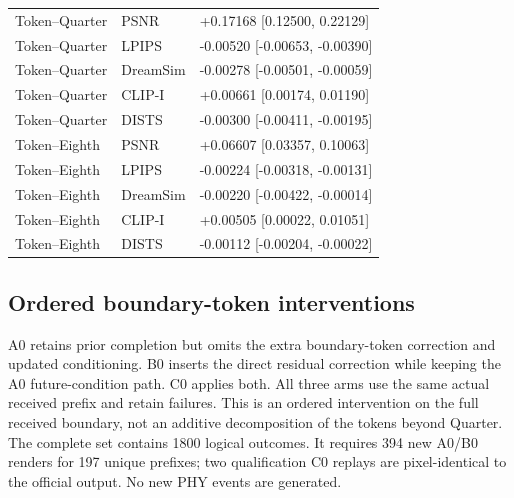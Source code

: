 \documentclass[10pt,letterpaper]{article}
\begin{document}
\begin{longtable}{@{}lll@{}}
Token--Quarter & PSNR & +0.17168 [0.12500, 0.22129]\\
Token--Quarter & LPIPS & -0.00520 [-0.00653, -0.00390]\\
Token--Quarter & DreamSim & -0.00278 [-0.00501, -0.00059]\\
Token--Quarter & CLIP-I & +0.00661 [0.00174, 0.01190]\\
Token--Quarter & DISTS & -0.00300 [-0.00411, -0.00195]\\
Token--Eighth & PSNR & +0.06607 [0.03357, 0.10063]\\
Token--Eighth & LPIPS & -0.00224 [-0.00318, -0.00131]\\
Token--Eighth & DreamSim & -0.00220 [-0.00422, -0.00014]\\
Token--Eighth & CLIP-I & +0.00505 [0.00022, 0.01051]\\
Token--Eighth & DISTS & -0.00112 [-0.00204, -0.00022]\\
\bottomrule\end{longtable}

\subsection{Ordered boundary-token interventions}
A0 retains prior completion but omits the extra boundary-token correction and updated conditioning. B0 inserts the direct residual correction while keeping the A0 future-condition path. C0 applies both. All three arms use the same actual received prefix and retain failures. This is an ordered intervention on the full received boundary, not an additive decomposition of the tokens beyond Quarter. The complete set contains 1800 logical outcomes. It requires 394 new A0/B0 renders for 197 unique prefixes; two qualification C0 replays are pixel-identical to the official output. No new PHY events are generated.
\end{document}
